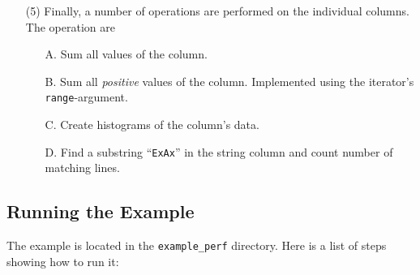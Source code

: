 \documentclass[a4paper]{article}
\begin{document}
\begin{enumerate}
  \item[(5)]  Finally, a number of operations are performed on the
    individual columns.  The operation are
    \begin{itemize}
    \item[A.] Sum all values of the column.
    \item[B.] Sum all \textsl{positive} values of the column.
      Implemented using the iterator's \texttt{range}-argument.
    \item[C.] Create histograms of the column's data.
    \item[D.] Find a substring ``\texttt{ExAx}'' in the string column
      and count number of matching lines.

    \end{itemize}

\end{enumerate}


\subsection*{Running the Example}
The example is located in the \texttt{example\_perf} directory.  Here
is a list of steps showing how to run it:
\end{document}
